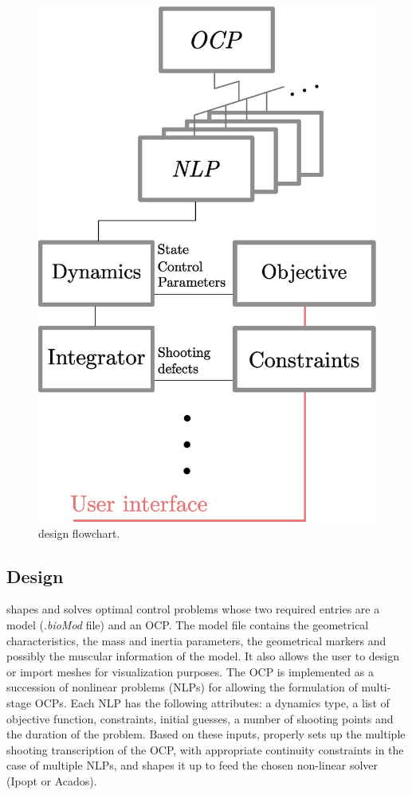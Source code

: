 \begin{figure}[t!]
\centering
\includegraphics[width=0.9\columnwidth]{figures/design.eps}
\caption{\bioptim design flowchart.}
\label{fig:dependencies}
\vspace*{-0.5cm}
\end{figure}


\subsection{Design}
\bioptim shapes and solves optimal control problems whose two required entries are a model (.\textit{bioMod} file) and an OCP.
The model file contains the geometrical characteristics, the mass and inertia parameters, the geometrical markers and possibly the muscular information of the model. 
It also allows the user to design or import meshes for visualization purposes.
The OCP is implemented as a succession of nonlinear problems (NLPs) for allowing the formulation of multi-stage OCPs. Each NLP has the following attributes: a dynamics type, a list of objective function, constraints, initial guesses, a number of shooting points and the duration of the problem.
Based on these inputs, \bioptim properly sets up the multiple shooting transcription of the OCP, with appropriate continuity constraints in the case of multiple NLPs, and shapes it up to feed the chosen non-linear solver (Ipopt or Acados). 

